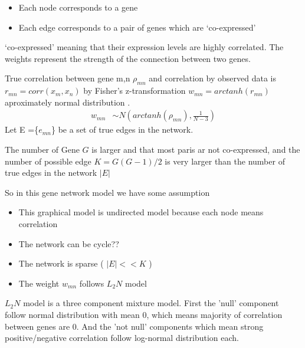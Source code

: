 \documentclass[11pt]{article}
\begin{document}
\begin{itemize}
\item Each node corresponds to a gene
\item Each edge corresponds to a pair of genes which are ‘co-expressed’
\end{itemize}
‘co-expressed’ meaning that their expression levels are highly correlated. The weights represent the strength of the connection between two genes.

True correlation between gene m,n $\rho_{mn}$ and correlation by observed data is $r_{mn} = corr(x_{m},x_{n})$
by Fisher's z-transformation $w_{mn} = arctanh(r_{mn})$ aproximately normal distribution .
  \begin{align}
    w_{mn} &\sim N(arctanh(\rho_{mn}), \frac{1}{N-3})
  \end{align}
Let E =\{$e_{mn}$\} be a set of true edges in the network.

The number of Gene $G$ is larger and that most paris ar not co-expressed, and the number of possible edge $K=G(G-1)/2$ is very larger than the number of true edges in the network $|E|$

So in this gene network model we have some assumption
\begin{itemize}
\item This graphical model is undirected model because each node means correlation
\item The network can be cycle??
\item The network is sparse ( $|E| << K$ )
\item The weight $w_{mn}$ follows $L_{2}N$ model 
\end{itemize}
 $L_{2}N$ model is a three component mixture model. First the 'null' component follow normal distribution with mean 0, which means majority of correlation between genes are 0. And the 'not null' components which mean strong positive/negative correlation follow log-normal distribution each.
\end{document}
